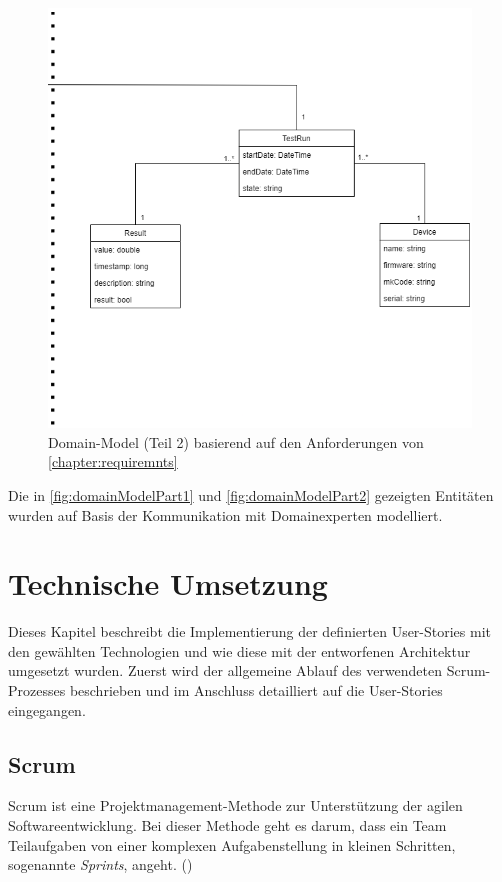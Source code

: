 \documentclass[a4paper, fontsize=11pt, parskip=half, twoside]{scrreprt}
\begin{document}
	\begin{figure}[ht]
		\centering
		\includegraphics[scale=0.6]{assets/TCMS_DomainModel_part2.png}
		\caption{Domain-Model (Teil 2) basierend auf den Anforderungen von \autoref{chapter:requiremnts}}
		\label{fig:domainModelPart2}
	\end{figure}
	
	Die in \autoref{fig:domainModelPart1} und \autoref{fig:domainModelPart2} gezeigten Entitäten wurden auf Basis der Kommunikation mit Domainexperten modelliert.
	
	
	
	\chapter{Technische Umsetzung}
	Dieses Kapitel beschreibt die Implementierung der definierten User-Stories mit den gewählten Technologien und wie diese mit der entworfenen Architektur umgesetzt wurden. 
	Zuerst wird der allgemeine Ablauf des verwendeten Scrum-Prozesses beschrieben und im Anschluss detailliert auf die User-Stories eingegangen. 

	\section{Scrum}
	Scrum ist eine Projektmanagement-Methode zur Unterstützung der agilen Softwareentwicklung.
	Bei dieser Methode geht es darum, dass ein Team Teilaufgaben von einer komplexen Aufgabenstellung in kleinen Schritten, sogenannte \emph{Sprints}, angeht. (\textcite{rubin_essential_2012})
	
\end{document}

